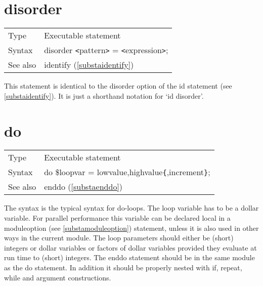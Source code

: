 
\section{disorder}
\label{substadisorder}

\noindent \begin{tabular}{ll}
Type & Executable statement \\
Syntax & disorder {\tt<}pattern{\tt>} = {\tt<}expression{\tt>};
\\ See also & identify (\ref{substaidentify})
\end{tabular} \vspace{4mm}

\noindent This statement is identical to the disorder 
option of the id 
statement (see \ref{substaidentify}). It is just a shorthand notation for 
`id disorder'. \vspace{10mm}


\section{do}
\label{substado}

\noindent \begin{tabular}{ll}
Type & Executable statement\\
Syntax & do \$loopvar = lowvalue,highvalue\verb:{:,increment\verb:}:;
\\ See also & enddo (\ref{substaenddo})
\end{tabular} \vspace{4mm}

\noindent The syntax is the typical syntax for do-loops. The loop variable 
has to be a dollar variable. For parallel performance this variable can be 
declared local in a moduleoption (see \ref{substamoduleoption}) statement, 
unless it is also used in other ways in the current module. The loop 
parameters should either be (short) integers or dollar variables or factors 
of dollar variables provided they evaluate at run time to (short) integers. 
The enddo statement should be in the same module as the do statement. In 
addition it should be properly nested with if, repeat, while and argument 
constructions.

